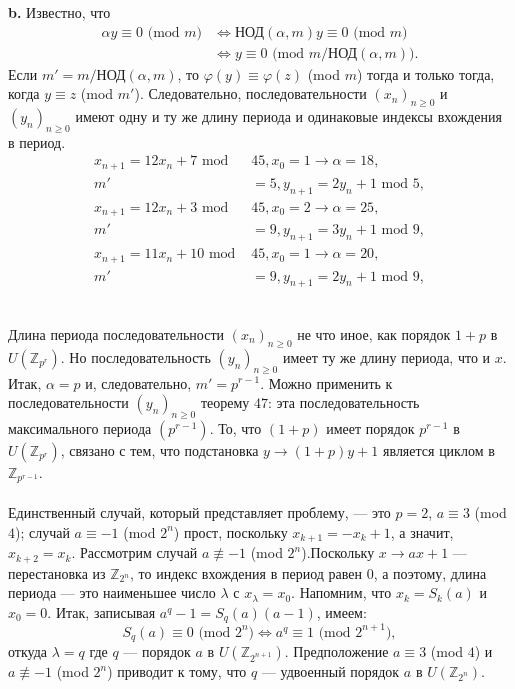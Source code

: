 \documentclass{mai_book}
\begin{document}
\textbf{b. } Известно, что
\begin{align*}
	\alpha y \equiv 0 \text{ (mod } m) &\Longleftrightarrow \text{НОД} (\alpha,m)y \equiv 0 \text{ (mod } m) \\
	&\Longleftrightarrow y \equiv 0 \text{ (mod } m\text{/НОД}(\alpha,m)).
\end{align*}
Если $m' = m\text{/НОД}(\alpha,m)$, то $\varphi (y) \equiv \varphi (z)$  (mod $m$) тогда и только тогда, когда $y \equiv z$ (mod $m'$). Следовательно, последовательности $(x_n)_{n \ge 0}$ и $(y_n)_{n \ge 0}$ имеют одну и ту же длину периода и одинаковые индексы вхождения в период.
\begin{align*}
	x_{n+1} = 12x_n + 7 \text{ mod } &45, x_0 = 1 \longrightarrow \alpha = 18, \\
	m' &= 5, y_{n+1} = 2y_n + 1 \text{ mod } 5, \\
	x_{n+1} = 12x_n + 3 \text{ mod } &45, x_0 = 2 \longrightarrow \alpha = 25, \\
	m' &= 9, y_{n+1} = 3y_n + 1 \text{ mod } 9, \\ 
	x_{n+1} = 11x_n + 10 \text{ mod } &45, x_0 = 1 \longrightarrow \alpha = 20, \\
	m' &= 9, y_{n+1} = 2y_n + 1 \text{ mod } 9,
\end{align*}

 \\

Длина периода последовательности $(x_n)_{n \ge 0}$ не что иное, как порядок $1+p$ в $U(\mathbb{Z}_{p^r})$. Но последовательность $(y_n)_{n \ge 0}$ имеет ту же длину периода, что и $x$. Итак, $\alpha = p$ и, следовательно, $m' = p^{r-1}$. Можно применить к последовательности $(y_n)_{n \ge 0}$ теорему $47$: эта  последовательность максимального периода $(p^{r-1})$. То, что $(1+p)$ имеет порядок $p^{r-1}$ в $U(\mathbb{Z}_{p^r})$, связано с тем, что подстановка $y \to (1+p)y+1$ является циклом в $\mathbb{Z}_{p^{r-1}}$. \\

 \\

Единственный случай, который представляет проблему, --- это $p = 2$, $a \equiv 3$ (mod $4$); случай $a \equiv -1$ (mod $2^n$) прост, поскольку $x_{k+1} = -x_k +1$, а значит, $x_{k+2} = x_k$. Рассмотрим случай $a \not\equiv -1$ (mod $2^n$).Поскольку $x \to ax+1$ --- перестановка из $\mathbb{Z}_{2^n}$, то индекс вхождения в период равен $0$, а поэтому, длина периода --- это наименьшее число $\lambda$ с $x_{\lambda} = x_0$. Напомним, что $x_k = S_k (a)$ и $x_0 = 0$. Итак, записывая $a^q - 1 = S_q(a)(a-1)$, имеем:
\begin{equation*}
	S_q(a) \equiv 0 \text{ (mod } 2^n) \Longleftrightarrow a^q \equiv 1 \text{ (mod } 2^{n+1}),
\end{equation*}
откуда $\lambda = q$ где $q$ --- порядок $a$ в $U(\mathbb{Z}_{2^{n+1}})$. Предположение $a \equiv 3$ (mod $4$) и $a \not \equiv -1$ (mod $2^n$) приводит к тому, что $q$ --- удвоенный  порядок $a$ в $U(\mathbb{Z}_{2^n})$. \\
\end{document}
